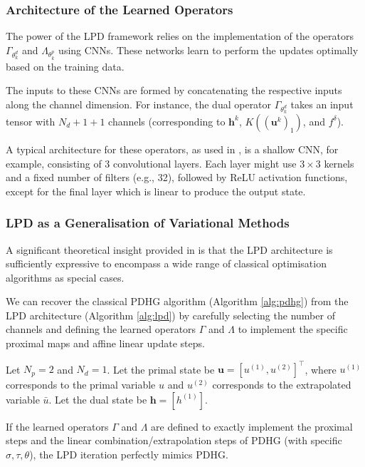 \subsubsection{Architecture of the Learned Operators}

The power of the LPD framework relies on the implementation of the operators $\Gamma_{\theta_k^d}$ and $\Lambda_{\theta_k^p}$ using CNNs. These networks learn to perform the updates optimally based on the training data.

The inputs to these CNNs are formed by concatenating the respective inputs along the channel dimension. For instance, the dual operator $\Gamma_{\theta_k^d}$ takes an input tensor with $N_d + 1 + 1$ channels (corresponding to $\mathbf{h}^k$, $K((\mathbf{u}^k)_1)$, and $f^\delta$).

A typical architecture for these operators, as used in \cite{adler2018learned}, is a shallow CNN, for example, consisting of 3 convolutional layers. Each layer might use $3\times 3$ kernels and a fixed number of filters (e.g., 32), followed by ReLU activation functions, except for the final layer which is linear to produce the output state.

\subsubsection{LPD as a Generalisation of Variational Methods}

A significant theoretical insight provided in \cite{adler2018learned} is that the LPD architecture is sufficiently expressive to encompass a wide range of classical optimisation algorithms as special cases.

\begin{exm}\normalfont
We can recover the classical PDHG algorithm (Algorithm \ref{alg:pdhg}) from the LPD architecture (Algorithm \ref{alg:lpd}) by carefully selecting the number of channels and defining the learned operators $\Gamma$ and $\Lambda$ to implement the specific proximal maps and affine linear update steps.

Let $N_p=2$ and $N_d=1$. Let the primal state be $\mathbf{u} = [u^{(1)}, u^{(2)}]^\top$, where $u^{(1)}$ corresponds to the primal variable $u$ and $u^{(2)}$ corresponds to the extrapolated variable $\bar{u}$. Let the dual state be $\mathbf{h} = [h^{(1)}]$.

If the learned operators $\Gamma$ and $\Lambda$ are defined to exactly implement the proximal steps and the linear combination/extrapolation steps of PDHG (with specific $\sigma, \tau, \theta$), the LPD iteration perfectly mimics PDHG.
\end{exm}

